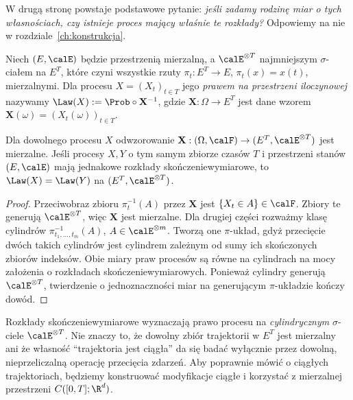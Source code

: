 W drugą stronę powstaje podstawowe pytanie: \emph{jeśli zadamy
rodzinę miar o tych własnościach, czy istnieje proces mający właśnie
te rozkłady?} Odpowiemy na nie w rozdziale~\ref{ch:konstrukcja}.

\begin{definicja}
Niech $(E,\calE)$ będzie przestrzenią mierzalną, a
$\calE^{\otimes T}$ najmniejszym $\sigma$-ciałem na $E^T$,
które czyni wszystkie rzuty $\pi_t:E^T\to E$, $\pi_t(x)=x(t)$,
mierzalnymi. Dla procesu $X=(X_t)_{t\in T}$ jego
\emph{prawem na przestrzeni iloczynowej} nazywamy
$\Law(X):=\Prob\circ\mathbf X^{-1}$, gdzie
$\mathbf X:\Omega\to E^T$ jest dane wzorem
$\mathbf X(\omega)=(X_t(\omega))_{t\in T}$.
\end{definicja}

\begin{stwierdzenie}
Dla dowolnego procesu $X$ odwzorowanie
$\mathbf X:(\Omega,\calF)\to(E^T,\calE^{\otimes T})$ jest
mierzalne. Jeśli procesy $X,Y$ o tym samym zbiorze czasów $T$
i przestrzeni stanów $(E,\calE)$ mają jednakowe rozkłady
skończeniewymiarowe, to $\Law(X)=\Law(Y)$ na
$(E^T,\calE^{\otimes T})$.
\end{stwierdzenie}
\begin{proof}
Przeciwobraz zbioru $\pi_t^{-1}(A)$ przez $\mathbf X$ jest
$\{X_t\in A\}\in\calF$. Zbiory te generują $\calE^{\otimes T}$,
więc $\mathbf X$ jest mierzalne. Dla drugiej części rozważmy
klasę cylindrów $\pi_{t_1,\ldots,t_m}^{-1}(A)$,
$A\in\calE^{\otimes m}$. Tworzą one $\pi$-układ, gdyż przecięcie
dwóch takich cylindrów jest cylindrem zależnym od sumy ich
skończonych zbiorów indeksów. Obie miary praw procesów
są równe na cylindrach na mocy założenia o rozkładach
skończeniewymiarowych. Ponieważ cylindry generują
$\calE^{\otimes T}$, twierdzenie o jednoznaczności miar
na generującym $\pi$-układzie kończy dowód.
\end{proof}

\begin{uwaga}
Rozkłady skończeniewymiarowe wyznaczają prawo procesu na
\emph{cylindrycznym} $\sigma$-ciele $\calE^{\otimes T}$.
Nie znaczy to, że dowolny zbiór trajektorii w $E^T$ jest mierzalny
ani że własność ``trajektoria jest ciągła'' da się badać
wyłącznie przez dowolną, nieprzeliczalną operację przecięcia
zdarzeń. Aby poprawnie mówić o ciągłych trajektoriach, będziemy
konstruować modyfikacje ciągłe i korzystać z mierzalnej przestrzeni
$C([0,T];\R^d)$.
\end{uwaga}


